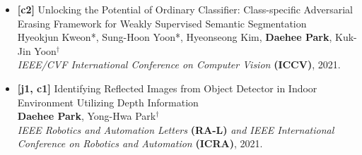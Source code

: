 \documentclass[a4paper,11pt]{article}
\begin{document}
\begin{itemize}[leftmargin=0.25cm]
\item \textbf{[c2]} Unlocking the Potential of Ordinary Classifier: Class-specific Adversarial Erasing Framework for Weakly Supervised Semantic Segmentation\\
Hyeokjun Kweon*, Sung-Hoon Yoon*, Hyeonseong Kim, \textbf{Daehee Park}, Kuk-Jin Yoon$^\dagger$\\
\textit{IEEE/CVF International Conference on Computer Vision} \textbf{(ICCV)}, 2021.

\item \textbf{[j1, c1]} Identifying Reflected Images from Object Detector in Indoor Environment Utilizing Depth Information\\
\textbf{Daehee Park}, Yong-Hwa Park$^\dagger$\\
\textit{IEEE Robotics and Automation Letters} \textbf{(RA-L)} \textit{and IEEE International Conference on Robotics and Automation} \textbf{(ICRA)}, 2021.


\end{itemize}


\end{document}

